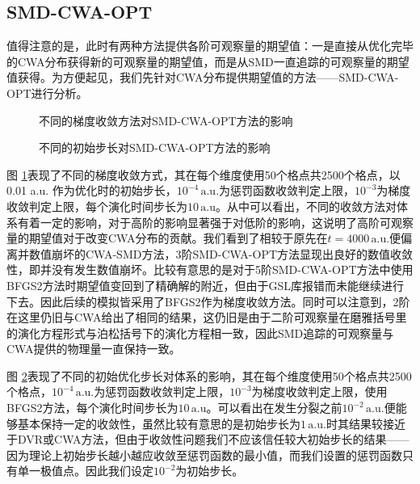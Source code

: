 \subsection{SMD-CWA-OPT}
值得注意的是，此时有两种方法提供各阶可观察量的期望值：一是直接从优化完毕的CWA分布获得新的可观察量的期望值，而是从SMD一直追踪的可观察量的期望值获得。为方便起见，我们先针对CWA分布提供期望值的方法——SMD-CWA-OPT进行分析。
\begin{figure}
\centering
{}
\caption{不同的梯度收敛方法对SMD-CWA-OPT方法的影响}
\label{smd-cwa-opt-method}
\end{figure}

\begin{figure}
\centering
{}
\caption{不同的初始步长对SMD-CWA-OPT方法的影响}
\label{smd-cwa-opt-init}
\end{figure}

图 \ref{smd-cwa-opt-method}表现了不同的梯度收敛方式，其在每个维度使用50个格点共2500个格点，以0.01 a.u. 作为优化时的初始步长，$10^{-4} \, \mathrm{a.u.}$为惩罚函数收敛判定上限，$10^{-3}$为梯度收敛判定上限，每个演化时间步长为$10 \, \mathrm{a.u}$。从中可以看出，不同的收敛方法对体系有着一定的影响，对于高阶的影响显著强于对低阶的影响，这说明了高阶可观察量的期望值对于改变CWA分布的贡献。我们看到了相较于原先在$t = 4000 \, \mathrm{a.u.}$便偏离并数值崩坏的CWA-SMD方法，3阶SMD-CWA-OPT方法显现出良好的数值收敛性，即并没有发生数值崩坏。比较有意思的是对于5阶SMD-CWA-OPT方法中使用BFGS2方法时期望值变回到了精确解的附近，但由于GSL库报错而未能继续进行下去。因此后续的模拟皆采用了BFGS2作为梯度收敛方法。同时可以注意到，2阶在这里仍旧与CWA给出了相同的结果，这仍旧是由于二阶可观察量在磨雅括号里的演化方程形式与泊松括号下的演化方程相一致，因此SMD追踪的可观察量与CWA提供的物理量一直保持一致。

图 \ref{smd-cwa-opt-init}表现了不同的初始优化步长对体系的影响，其在每个维度使用50个格点共2500个格点，$10^{-4} \, \mathrm{a.u.}$为惩罚函数收敛判定上限，$10^{-3}$为梯度收敛判定上限，使用BFGS2方法，每个演化时间步长为$10 \, \mathrm{a.u}$。可以看出在发生分裂之前$10^{-2} \, \mathrm{a.u.}$便能够基本保持一定的收敛性，虽然比较有意思的是初始步长为$1 \, \mathrm{a.u.}$时其结果较接近于DVR或CWA方法，但由于收敛性问题我们不应该信任较大初始步长的结果——因为理论上初始步长越小越应收敛至惩罚函数的最小值，而我们设置的惩罚函数只有单一极值点。因此我们设定$10^{-2}$为初始步长。

